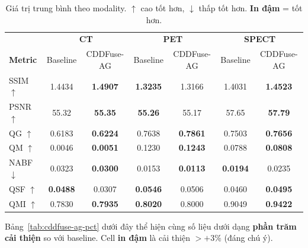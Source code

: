 \begin{table}[h]
\centering
\small
\caption{Giá trị trung bình theo modality. $\uparrow$ cao tốt hơn, $\downarrow$ thấp tốt hơn. \textbf{In đậm} = tốt hơn.}
\label{tab:cddfuse-ag-per-modal}
\setlength{\tabcolsep}{5pt}
\begin{tabular}{l|cc|cc|cc}
\toprule
& \multicolumn{2}{c|}{\textbf{CT}} & \multicolumn{2}{c|}{\textbf{PET}} & \multicolumn{2}{c}{\textbf{SPECT}} \\
\textbf{Metric} & Baseline & CDDFuse-AG & Baseline & CDDFuse-AG & Baseline & CDDFuse-AG \\
\midrule
SSIM $\uparrow$   & 1.4434          & \textbf{1.4907} & \textbf{1.3235} & 1.3166          & 1.4031          & \textbf{1.4523} \\
PSNR $\uparrow$   & 55.32           & \textbf{55.35}  & \textbf{55.26}  & 55.17           & 57.65           & \textbf{57.79}  \\
QG   $\uparrow$   & 0.6183          & \textbf{0.6224} & 0.7638          & \textbf{0.7861} & 0.7503          & \textbf{0.7656} \\
QM   $\uparrow$   & 0.0046          & \textbf{0.0051} & 0.1230          & \textbf{0.1243} & 0.0788          & \textbf{0.0808} \\
NABF $\downarrow$ & 0.0323          & \textbf{0.0300} & 0.0153          & \textbf{0.0113} & \textbf{0.0194} & 0.0235          \\
QSF  $\uparrow$   & \textbf{0.0488} & 0.0307          & \textbf{0.0546} & 0.0506          & 0.0460          & \textbf{0.0495} \\
QMI  $\uparrow$   & 0.7830          & \textbf{0.7935} & \textbf{0.8020} & 0.8000          & 0.9049          & \textbf{0.9422} \\
\bottomrule
\end{tabular}
\end{table}

Bảng~\ref{tab:cddfuse-ag-pct} dưới đây thể hiện cùng số liệu dưới dạng \textbf{phần trăm cải thiện} so với baseline. Cell \textbf{in đậm} là cải thiện $> +3\%$ (đáng chú ý).

